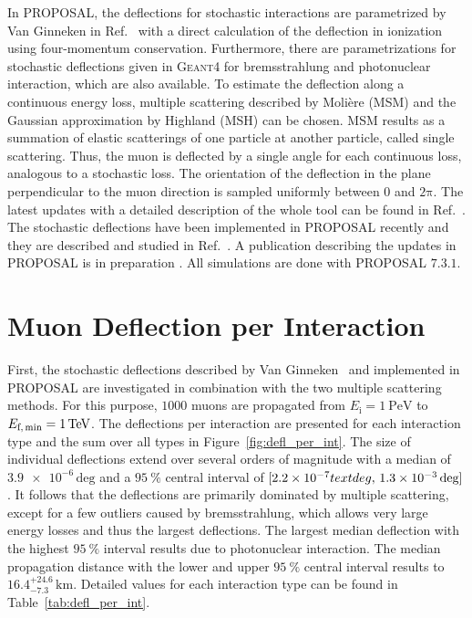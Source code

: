 In PROPOSAL, the deflections for stochastic interactions are parametrized by Van Ginneken 
in Ref.~\cite{Van_Ginneken} with a direct calculation of the deflection in 
ionization using four-momentum conservation. 
Furthermore, there are parametrizations for stochastic deflections given in \textsc{Geant4} \cite{GEANT4_standard, GEANT4} 
for bremsstrahlung and photonuclear interaction, which 
are also available.
To estimate the deflection along 
a continuous energy loss, multiple scattering described by Molière 
(MSM) \cite{moliere_scattering} and the Gaussian approximation by 
Highland (MSH) \cite{HIGHLAND_1975}
can be chosen. 
MSM results as a summation of elastic scatterings of one particle 
at another particle, called single scattering. Thus, the muon is deflected by a 
single angle for each continuous loss, analogous to a stochastic loss.
The orientation of the deflection in the plane perpendicular to the muon direction is 
sampled uniformly between $0$ and $2\mathrm{\pi}$.
The latest updates with a detailed description of the whole tool can be found 
in Ref.~\cite{phd_soedingrekso}. 
The stochastic deflections have been implemented in PROPOSAL recently and they are 
described and studied in Ref.~\cite{Gutjahr_2021}.
A publication describing the 
updates in PROPOSAL is in preparation 
\cite{alameddine_et_al}.
All simulations are done with PROPOSAL $7.3.1$.

\section{Muon Deflection per Interaction}\label{sec:defl_per_int}
First, the stochastic deflections described by Van Ginneken~\cite{Van_Ginneken} 
and implemented 
in PROPOSAL are investigated in combination with the two multiple scattering methods. 
For this purpose, $\num{1000}$ muons are propagated from $E_{\text{i}} = \SI{1}{\peta\electronvolt}$ to $E_{\text{f,\,min}} = \SI{1}{\tera\electronvolt}$.
The deflections per interaction are presented 
for each interaction type and the sum over all types in Figure~\ref{fig:defl_per_int}. 
The size of individual deflections 
extend over several orders of magnitude with a median of $\num{3.9e-6}\,\text{deg}$
and a $\SI{95}{\percent}$ central interval of $[\num{2.2e-7}\\text{deg}, \,\num{1.3e-3}\,\text{deg}]$. 
It follows that the deflections are primarily dominated by multiple scattering, except for a few outliers caused by bremsstrahlung, which 
allows very large energy losses and thus the largest deflections. 
The largest median deflection with the highest $\SI{95}{\percent}$ interval results due to photonuclear interaction.
The median propagation distance with the lower and upper $\SI{95}{\percent}$ 
central interval results to $16.4_{-7.3}^{+24.6}\,\si{\kilo\meter}$.
Detailed values for each interaction type can be found in Table~\ref{tab:defl_per_int}.

